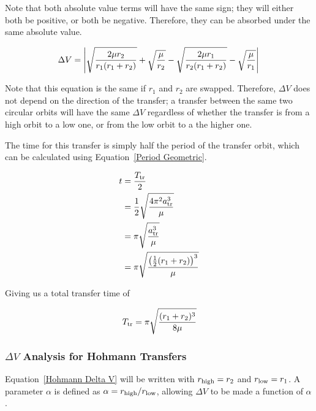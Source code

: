 \documentclass[../basicOrbitalDynamics.tex]{subfiles}
\begin{document}
Note that both absolute value terms will have the same sign; they will either both be positive, or both be negative. Therefore, they can be absorbed under the same absolute value.

\begin{equation}\label{Hohmann Delta V}
    \Delta V = \left|\sqrt{\frac{2\mu{}r_2}{r_1(r_1+r_2)}}+\sqrt{\frac{\mu}{r_2}}-\sqrt{\frac{2\mu{}r_1}{r_2(r_1+r_2)}}-\sqrt{\frac{\mu}{r_1}}\right|\\
\end{equation}

Note that this equation is the same if $r_1$ and $r_2$ are swapped. Therefore, $\Delta V$ does not depend on the direction of the transfer; a transfer between the same two circular orbits will have the same $\Delta V$ regardless of whether the transfer is from a high orbit to a low one, or from the low orbit to a the higher one.

The time for this transfer is simply half the period of the transfer orbit, which can be calculated using Equation~\eqref{Period Geometric}.

\begin{align*}
    t &= \frac{{T}_\text{tr}}{2} \\
 &= \frac{1}{2}\sqrt{\frac{4\pi^2 {a}_\text{tr}^3}{\mu}} \\
 &= \pi\sqrt{\frac{{a}_\text{tr}^3}{\mu}} \\
 &= \pi\sqrt{\frac{\left(\frac{1}{2}(r_1+r_2)\right)^3}{\mu}} \\
\end{align*}

Giving us a total transfer time of

\begin{equation}\label{Hohmann time}
    {T}_\text{tr}=\pi\sqrt{\frac{(r_1+r_2)^3}{8\mu}}
\end{equation}

\subsubsection{\texorpdfstring{$\Delta V$}{DeltaV} Analysis for Hohmann Transfers}\label{sec:DeltaV analysis for Hohmann}

Equation~\eqref{Hohmann Delta V} will be written with ${r}_\text{high}=r_2$ and ${r}_\text{low}=r_1$. A parameter $\alpha$ is defined as $\alpha={r}_\text{high}/{r}_\text{low}$, allowing $\Delta V$ to be made a function of $\alpha$.
\end{document}
